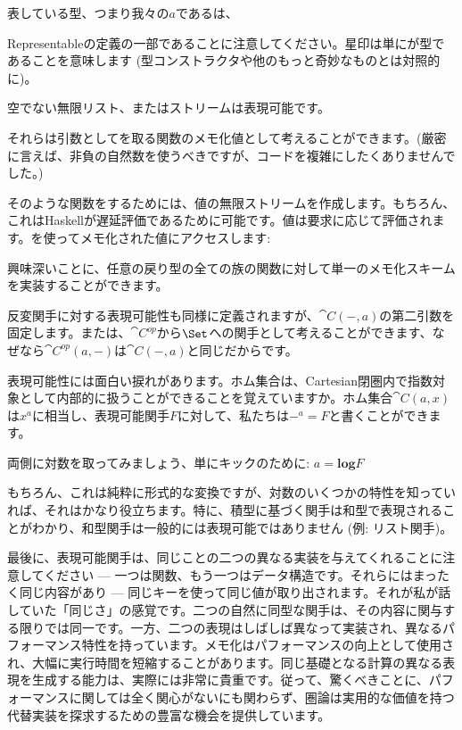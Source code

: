 表している型、つまり我々の$a$であるは、\code

{Representable}の定義の一部であることに注意してください。星印は単にが型であることを意味します (型コンストラクタや他のもっと奇妙なものとは対照的に)。

空でない無限リスト、またはストリームは表現可能です。

それらは引数としてを取る関数のメモ化値として考えることができます。(厳密に言えば、非負の自然数を使うべきですが、コードを複雑にしたくありませんでした。) 

そのような関数をするためには、値の無限ストリームを作成します。もちろん、これはHaskellが遅延評価であるために可能です。値は要求に応じて評価されます。を使ってメモ化された値にアクセスします: 

興味深いことに、任意の戻り型の全ての族の関数に対して単一のメモ化スキームを実装することができます。

反変関手に対する表現可能性も同様に定義されますが、$\cat{C}(-, a)$の第二引数を固定します。または、$\cat{C}^\mathit{op}$から$\Set$への関手として考えることができます、なぜなら$\cat{C}^\mathit{op}(a, -)$は$\cat{C}(-, a)$と同じだからです。

表現可能性には面白い捩れがあります。ホム集合は、Cartesian閉圏内で指数対象として内部的に扱うことができることを覚えていますか。ホム集合$\cat{C}(a, x)$は$x^a$に相当し、表現可能関手$F$に対して、私たちは$-^a = F$と書くことができます。

両側に対数を取ってみましょう、単にキックのために: $a = \mathbf{log}F$

もちろん、これは純粋に形式的な変換ですが、対数のいくつかの特性を知っていれば、それはかなり役立ちます。特に、積型に基づく関手は和型で表現されることがわかり、和型関手は一般的には表現可能ではありません (例: リスト関手)。

最後に、表現可能関手は、同じことの二つの異なる実装を与えてくれることに注意してください --- 一つは関数、もう一つはデータ構造です。それらにはまったく同じ内容があり --- 同じキーを使って同じ値が取り出されます。それが私が話していた「同じさ」の感覚です。二つの自然に同型な関手は、その内容に関与する限りでは同一です。一方、二つの表現はしばしば異なって実装され、異なるパフォーマンス特性を持っています。メモ化はパフォーマンスの向上として使用され、大幅に実行時間を短縮することがあります。同じ基礎となる計算の異なる表現を生成する能力は、実際には非常に貴重です。従って、驚くべきことに、パフォーマンスに関しては全く関心がないにも関わらず、圏論は実用的な価値を持つ代替実装を探求するための豊富な機会を提供しています。

